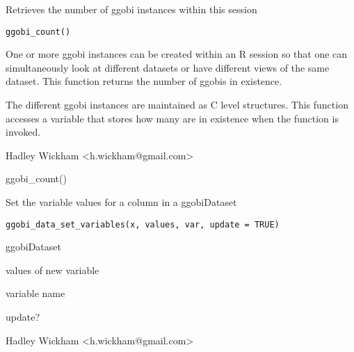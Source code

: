 \documentclass{article}
\begin{document}
\begin{Description}\relax
Retrieves the number of ggobi instances within this session
\end{Description}
\begin{Usage}
\begin{verbatim}ggobi_count()\end{verbatim}
\end{Usage}
\begin{Arguments}
\end{Arguments}
\begin{Details}\relax
One or more ggobi instances can be created within an R session so that one
can simultaneously look at different datasets or have different views
of the same dataset.  This function returns the number of ggobis in existence.

The different ggobi instances are maintained as C  level structures.
This function accesses a variable that stores how many are in existence
when the function is invoked.
\end{Details}
\begin{Author}\relax
Hadley Wickham <h.wickham@gmail.com>
\end{Author}
\begin{Examples}
\begin{ExampleCode}ggobi_count()\end{ExampleCode}
\end{Examples}

\begin{Description}\relax
Set the variable values for a column in a ggobiDataset
\end{Description}
\begin{Usage}
\begin{verbatim}ggobi_data_set_variables(x, values, var, update = TRUE)\end{verbatim}
\end{Usage}
\begin{Arguments}
\begin{ldescription}
\item[\code{x}] ggobiDataset
\item[\code{values}] values of new variable
\item[\code{var}] variable name
\item[\code{update}] update?
\end{ldescription}
\end{Arguments}
\begin{Details}\relax
\end{Details}
\begin{Author}\relax
Hadley Wickham <h.wickham@gmail.com>
\end{Author}
\begin{Examples}
\begin{ExampleCode}\end{ExampleCode}
\end{Examples}
\end{document}
